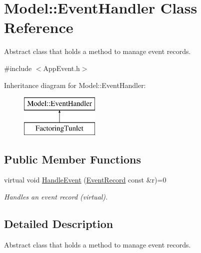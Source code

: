 \hypertarget{class_model_1_1_event_handler}{\section{Model\-:\-:Event\-Handler Class Reference}
\label{class_model_1_1_event_handler}
}


Abstract class that holds a method to manage event records.  




{\ttfamily \#include $<$App\-Event.\-h$>$}

Inheritance diagram for Model\-:\-:Event\-Handler\-:\begin{figure}[H]
\begin{center}
\leavevmode
\includegraphics[height=2.000000cm]{class_model_1_1_event_handler}
\end{center}
\end{figure}
\subsection*{Public Member Functions}
\begin{DoxyCompactItemize}
\item 
virtual void \hyperlink{class_model_1_1_event_handler_a0a84c727f41c358350a2f3522ffba03b}{Handle\-Event} (\hyperlink{class_model_1_1_event_record}{Event\-Record} const \&r)=0
\begin{DoxyCompactList}\small\item\em Handles an event record (virtual). \end{DoxyCompactList}\end{DoxyCompactItemize}


\subsection{Detailed Description}
Abstract class that holds a method to manage event records. 

